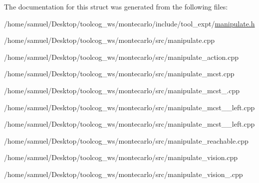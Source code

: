 The documentation for this struct was generated from the following files\+:\begin{DoxyCompactItemize}
\item 
/home/samuel/\+Desktop/toolcog\+\_\+ws/montecarlo/include/tool\+\_\+expt/\hyperlink{manipulate_8h}{manipulate.\+h}\item 
/home/samuel/\+Desktop/toolcog\+\_\+ws/montecarlo/src/manipulate.\+cpp\item 
/home/samuel/\+Desktop/toolcog\+\_\+ws/montecarlo/src/manipulate\+\_\+action.\+cpp\item 
/home/samuel/\+Desktop/toolcog\+\_\+ws/montecarlo/src/manipulate\+\_\+mcst.\+cpp\item 
/home/samuel/\+Desktop/toolcog\+\_\+ws/montecarlo/src/manipulate\+\_\+mcst\+\_.\+cpp\item 
/home/samuel/\+Desktop/toolcog\+\_\+ws/montecarlo/src/manipulate\+\_\+mcst\+\_\+\_\+left.\+cpp\item 
/home/samuel/\+Desktop/toolcog\+\_\+ws/montecarlo/src/manipulate\+\_\+mcst\+\_\+\_\+left.\+cpp\item 
/home/samuel/\+Desktop/toolcog\+\_\+ws/montecarlo/src/manipulate\+\_\+reachable.\+cpp\item 
/home/samuel/\+Desktop/toolcog\+\_\+ws/montecarlo/src/manipulate\+\_\+vision.\+cpp\item 
/home/samuel/\+Desktop/toolcog\+\_\+ws/montecarlo/src/manipulate\+\_\+vision\+\_.\+cpp\end{DoxyCompactItemize}
